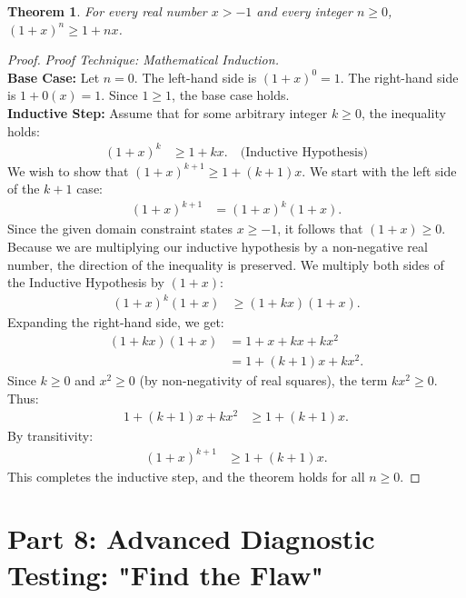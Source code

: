 \documentclass[11pt]{article}
\newtheorem{theorem}{Theorem}[section]
\theoremstyle{definition}
\theoremstyle{remark}
\begin{document}
\begin{itemize}
\begin{theorem}
For every real number $x > -1$ and every integer $n \ge 0$, $(1 + x)^n \ge 1 + nx$.
\end{theorem}
\begin{proof}
\textit{Proof Technique: Mathematical Induction.} \\
\textbf{Base Case:} Let $n = 0$. The left-hand side is $(1 + x)^0 = 1$. The right-hand side is $1 + 0(x) = 1$. Since $1 \ge 1$, the base case holds. \\
\textbf{Inductive Step:} Assume that for some arbitrary integer $k \ge 0$, the inequality holds:
\begin{align*}
    (1 + x)^k &\ge 1 + kx. \quad \text{(Inductive Hypothesis)}
\end{align*}
We wish to show that $(1 + x)^{k+1} \ge 1 + (k+1)x$. 
We start with the left side of the $k+1$ case:
\begin{align*}
    (1 + x)^{k+1} &= (1 + x)^k (1 + x).
\end{align*}
Since the given domain constraint states $x \ge -1$, it follows that $(1 + x) \ge 0$. Because we are multiplying our inductive hypothesis by a non-negative real number, the direction of the inequality is preserved. We multiply both sides of the Inductive Hypothesis by $(1 + x)$:
\begin{align*}
    (1 + x)^k (1 + x) &\ge (1 + kx)(1 + x).
\end{align*}
Expanding the right-hand side, we get:
\begin{align*}
    (1 + kx)(1 + x) &= 1 + x + kx + kx^2 \\
    &= 1 + (k+1)x + kx^2.
\end{align*}
Since $k \ge 0$ and $x^2 \ge 0$ (by non-negativity of real squares), the term $kx^2 \ge 0$. Thus:
\begin{align*}
    1 + (k+1)x + kx^2 &\ge 1 + (k+1)x.
\end{align*}
By transitivity:
\begin{align*}
    (1 + x)^{k+1} &\ge 1 + (k+1)x.
\end{align*}
This completes the inductive step, and the theorem holds for all $n \ge 0$.
\end{proof}

\newpage
\section{Part 8: Advanced Diagnostic Testing: "Find the Flaw"}


\end{itemize}
\end{document}

